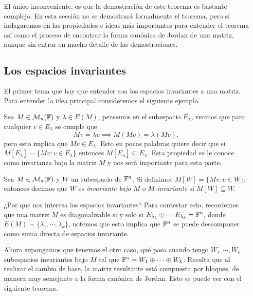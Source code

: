 El único inconveniente, es que la demostración de este teorema es bastante complejo. En esta sección no se demostrará formalmente el teorema, pero sí indagaremos en las propiedades e ideas más importantes para entender el teorema así como el proceso de encontrar la forma canónica de Jordan de una matriz, aunque sin entrar en mucho detalle de las demostraciones.



\subsection{Los espacios invariantes}

El primer tema que hay que entender son los espacios invariantes a una matriz. Para entender la idea principal consideremos el siguiente ejemplo.

Sea $M \in \mathcal{M}_n(\mathbb{F})$ y $\lambda \in E(M)$, pensemos en el subespacio $E_\lambda$, veamos que para cualquier $v \in E_\lambda$ se cumple que
\[
  Mv = \lambda v \implies M(Mv) = \lambda(Mv),
\]
pero esto implica que $Mv \in E_\lambda$. Esto en pocas palabras quiere decir que si $M[E_\lambda] = \{Mv : v \in E_\lambda\}$ entonces $M[E_\lambda] \subseteq E_\lambda$. Esta propiedad se le conoce como invarianza bajo la matriz $M$ y nos será importante para esta parte.

\begin{defi}
  Sea $M \in \mathcal{M}_n(\mathbb{F})$ y $W$ un subespacio de $\mathbb{F}^n$. Si definimos $M[W] = \{Mv : v \in W\}$, entonces decimos que $W$ es \emph{invariante bajo $M$} o \emph{$M$-invariante} si $M[W] \subseteq W$.
\end{defi}

¿Por que nos interesa los espacios invariantes? Para contestar esto, recordemos que una matriz $M$ es diagonalizable si y solo si $ E_{\lambda_1} \oplus \cdots E_{\lambda_k} = \mathbb{F}^n$, donde $E(M) = \{\lambda_1, \cdots, \lambda_k\}$, notemos que esto implica que $\mathbb{F}^n$ se puede descomponer como suma directa de espacios invariante.

Ahora supongamos que tenemos el otro caso, qué pasa cuando tengo $W_1, \cdots, W_k$ subespacios invariantes bajo $M$ tal que $\mathbb{F}^n = W_1 \oplus \cdots \oplus W_k$. Resulta que al realizar el cambio de base, la matriz resultante está compuesta por bloques, de manera muy semejante a la forma canónica de Jordan. Esto se puede ver con el siguiente teorema.

